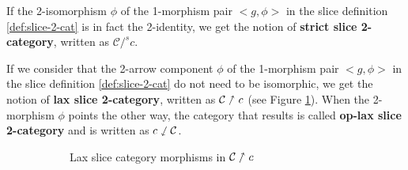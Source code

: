 \begin{defn}
    \label{def:strict-slice-2-cat}
    If the 2-isomorphism $\phi$ of the 1-morphism pair $\big<g,\phi\big>$ in the slice definition \ref{def:slice-2-cat} is in fact the 2-identity, we get the notion of \textbf{strict slice 2-category}, written as $\mathcal{C} /^s c$\label{nomencl:strict-slice}.
\end{defn}

\begin{defn}
    \label{def:lax-slice-2-cat}
    If we consider that the 2-arrow component $\phi$ of the 1-morphism pair $\big<g,\phi\big>$ in the slice definition \ref{def:slice-2-cat} do not need to be isomorphic, we get the notion of \textbf{lax slice 2-category}, written as $\mathcal{C}\nnearrow c$\label{nomencl:lax-slice}
    (see Figure \ref{fig:lax-slice-def}). When the 2-morphism $\phi$ points the other way, the category that results is called \textbf{op-lax slice 2-category} and is written as $c\sswarrow\mathcal{C}$\label{nomencl:oplax-slice}.
    \begin{figure}[t!]
        \centering
        \begin{subfigure}[t]{0.47\textwidth}
            \centering
            \caption{Lax slice category morphisms in $\mathcal{C}\nnearrow c$}
            \label{fig:lax-slice-def}
        \end{subfigure}%
        \hfill
        \begin{subfigure}[t]{0.47\textwidth}
            \centering
\end{subfigure}
\end{figure}
\end{defn}

